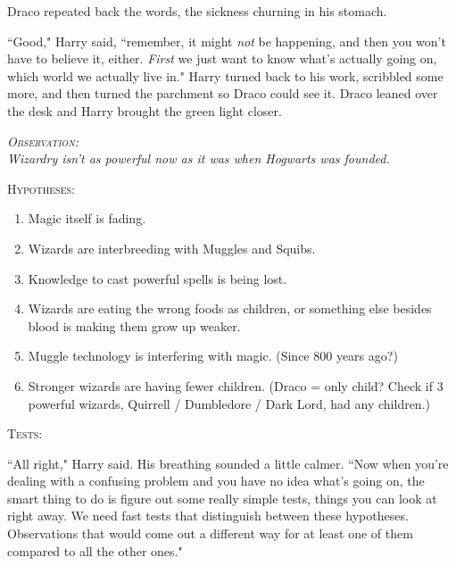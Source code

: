 Draco repeated back the words, the sickness churning in his stomach.

``Good," Harry said, ``remember, it might \emph{not} be happening, and then you won't have to believe it, either. \emph{First} we just want to know what's actually going on, which world we actually live in." Harry turned back to his work, scribbled some more, and then turned the parchment so Draco could see it. Draco leaned over the desk and Harry brought the green light closer.

\pagebreak[2]

\begin{center}
\itshape
{\scshape Observation:}\\
Wizardry isn't as powerful now as it was when Hogwarts was founded.

\vspace{8.0pt plus 2.0pt minus 1.0pt}%

{\scshape Hypotheses:}
\begin{enumerate}[1.]
    \firmlist
    \item Magic itself is fading.
    \item Wizards are interbreeding with Muggles and Squibs.
    \item Knowledge to cast powerful spells is being lost.
    \item Wizards are eating the wrong foods as children, or something else besides blood is making them grow up weaker.
    \item Muggle technology is interfering with magic. (Since 800 years ago?)
    \item Stronger wizards are having fewer children. (Draco = only child? Check if 3 powerful wizards, Quirrell / Dumbledore / Dark Lord, had any children.)
\end{enumerate}

{\scshape Tests:}
\end{center}

\vspace{1\baselineskip}

``All right," Harry said. His breathing sounded a little calmer. ``Now when you're dealing with a confusing problem and you have no idea what's going on, the smart thing to do is figure out some really simple tests, things you can look at right away. We need fast tests that distinguish between these hypotheses. Observations that would come out a different way for at least one of them compared to all the other ones."

